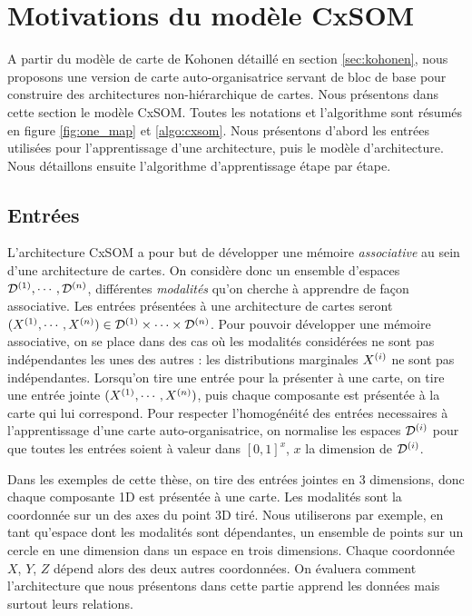 \section{Motivations du modèle CxSOM}
A partir du modèle de carte de Kohonen détaillé en section \ref{sec:kohonen}, nous proposons une version de carte auto-organisatrice servant de bloc de base pour construire des architectures non-hiérarchique de cartes. Nous présentons dans cette section le modèle CxSOM. Toutes les notations et l'algorithme sont résumés en figure \ref{fig:one_map} et \ref{algo:cxsom}. Nous présentons d'abord les entrées utilisées pour l'apprentissage d'une architecture, puis le modèle d'architecture. Nous détaillons ensuite l'algorithme d'apprentissage étape par étape. 

\subsection{Entrées}
L'architecture CxSOM a pour but de développer une mémoire \emph{associative} au sein d'une architecture de cartes. On considère donc un ensemble d'espaces $\mathcal{D}^{({1})}, \cdots , \mathcal{D}^{({n})}$, différentes \emph{modalités} qu'on cherche à apprendre de façon associative. Les entrées présentées à une architecture de cartes seront $(X^{({1})}, \cdots, X^{({n})}) \in \mathcal{D}^{({1})} \times \cdots \times \mathcal{D}^{({n})}$. Pour pouvoir développer une mémoire associative, on se place dans des cas où les modalités considérées ne sont pas indépendantes les unes des autres : les distributions marginales $X^{({i})}$ ne sont pas indépendantes. Lorsqu'on tire une entrée pour la présenter à une carte, on tire une entrée jointe $(X^{({1})}, \cdots , X^{({n})})$, puis chaque composante est présentée à la carte qui lui correspond. Pour respecter l'homogénéité des entrées necessaires à l'apprentissage d'une carte auto-organisatrice, on normalise les espaces $\mathcal{D}^{({i})}$ pour que toutes les entrées soient à valeur dans $[0,1]^x$, $x$ la dimension de $\mathcal{D}^{({i})}$.

Dans les exemples de cette thèse, on tire des entrées jointes en 3 dimensions, donc chaque composante 1D est présentée à une carte. Les modalités sont la coordonnée sur un des axes du point 3D tiré. Nous utiliserons par exemple, en tant qu'espace dont les modalités sont dépendantes, un ensemble de points sur un cercle en une dimension dans un espace en trois dimensions. Chaque coordonnée $X$, $Y$, $Z$ dépend alors des deux autres coordonnées. On évaluera comment l'architecture que nous présentons dans cette partie apprend les données mais surtout leurs relations. 

